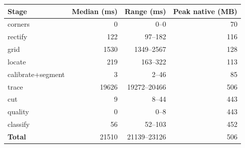 \begin{tabular}{@{}lrrr@{}}
\toprule
\textbf{Stage} & \textbf{Median (ms)} & \textbf{Range (ms)} & \textbf{Peak native (MB)}\\
\midrule
corners & 0 & 0--0 & 70\\
rectify & 122 & 97--182 & 116\\
grid & 1530 & 1349--2567 & 128\\
locate & 219 & 163--322 & 113\\
calibrate+segment & 3 & 2--46 & 85\\
trace & 19626 & 19272--20466 & 506\\
cut & 9 & 8--44 & 443\\
quality & 0 & 0--8 & 443\\
classify & 56 & 52--103 & 452\\
\midrule
\textbf{Total} & 21510 & 21139--23126 & 506\\
\bottomrule
\end{tabular}
